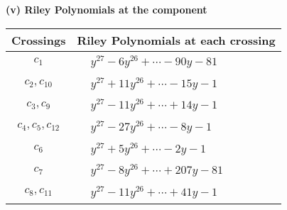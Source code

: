 \documentclass[1p]{elsarticle_modified}
\theoremstyle{definition}
\begin{document}
\newpage\renewcommand{\arraystretch}{1}
\flushleft \textbf{(v) Riley Polynomials at the component}\newline \\
\begin{tabular}{m{50pt}|m{274pt}}
Crossings & \hspace{64pt}Riley Polynomials at each crossing \\
\hline $$\begin{aligned}c_{1}\end{aligned}$$&$\begin{aligned}
&y^{27}-6 y^{26}+\cdots-90 y-81
\end{aligned}$\\
\hline $$\begin{aligned}c_{2},c_{10}\end{aligned}$$&$\begin{aligned}
&y^{27}+11 y^{26}+\cdots-15 y-1
\end{aligned}$\\
\hline $$\begin{aligned}c_{3},c_{9}\end{aligned}$$&$\begin{aligned}
&y^{27}-11 y^{26}+\cdots+14 y-1
\end{aligned}$\\
\hline $$\begin{aligned}c_{4},c_{5},c_{12}\end{aligned}$$&$\begin{aligned}
&y^{27}-27 y^{26}+\cdots-8 y-1
\end{aligned}$\\
\hline $$\begin{aligned}c_{6}\end{aligned}$$&$\begin{aligned}
&y^{27}+5 y^{26}+\cdots-2 y-1
\end{aligned}$\\
\hline $$\begin{aligned}c_{7}\end{aligned}$$&$\begin{aligned}
&y^{27}-8 y^{26}+\cdots+207 y-81
\end{aligned}$\\
\hline $$\begin{aligned}c_{8},c_{11}\end{aligned}$$&$\begin{aligned}
&y^{27}-11 y^{26}+\cdots+41 y-1
\end{aligned}$\\
\hline
\end{tabular}\\~\\
\end{document}

